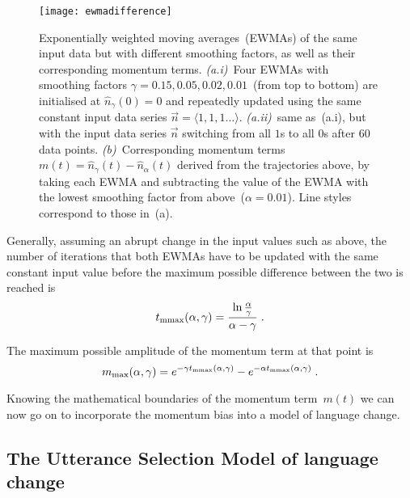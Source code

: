 \begin{figure}
\centering
\texttt{[image: ewmadifference]}
\caption[Exponentially weighted moving averages of the same input data but with different smoothing factors, as well as their corresponding momentum terms]{Exponentially weighted moving averages~(EWMAs) of the same input data but with different smoothing factors, as well as their corresponding momentum terms.
\textit{(a.i)}~Four EWMAs with smoothing factors $\gamma=0.15, 0.05, 0.02, 0.01$~(from top to bottom) are initialised at $\hat{n}_\gamma(0)=0$ and repeatedly updated using the same constant input data series $\vec{n}=\langle1,1,1\dots\rangle$. \textit{(a.ii)}~same as~(a.i), but with the input data series $\vec{n}$ switching from all $1$s to all $0$s after 60 data points. %
\textit{(b)}~Corresponding momentum terms~$m(t)=\hat{n}_\gamma(t)-\hat{n}_\alpha(t)$ derived from the trajectories above, by taking each EWMA and subtracting the value of the EWMA with the lowest smoothing factor from above~($\alpha=0.01$). Line styles correspond to those in~(a).}
\label{fig:ewmadifference}
\end{figure}

Generally, assuming an abrupt change in the input values such as above, the number of iterations that both EWMAs have to be updated with the same constant input value before the maximum possible difference between the two is reached is
\begin{equation}
t_{\rm mmax}(\alpha,\gamma)=\frac{\ln\frac{\alpha}{\gamma}}{\alpha-\gamma}\;.
\end{equation}

The maximum possible amplitude of the momentum term at that point is
\begin{equation}
m_{\rm max}(\alpha, \gamma)=e^{-\gamma t_{\rm mmax}(\alpha,\gamma)}-e^{-\alpha t_{\rm mmax}(\alpha,\gamma)}\;.
\end{equation}

Knowing the mathematical boundaries of the momentum term~$m(t)$ we can now go on to incorporate the momentum bias into a model of language change.

\subsection{The Utterance Selection Model of language change}

